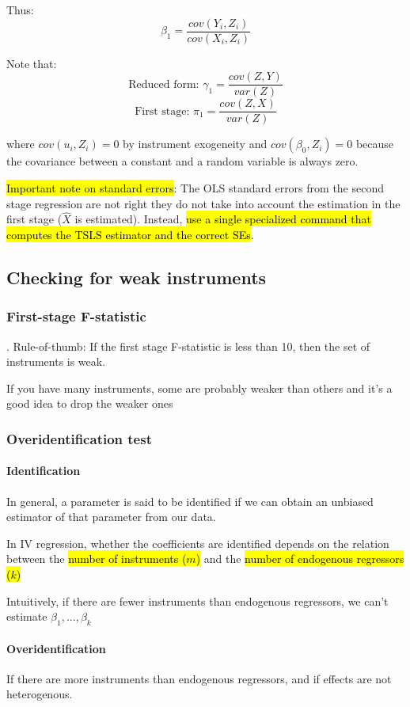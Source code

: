 \documentclass[a3paper, 8pt]{extarticle}
\begin{document}
\begin{multicols*}{5}
Thus: $$\beta_1=\frac{cov(Y_i,Z_i)}{cov(X_i,Z_i)}$$

Note that: $$\text{Reduced form:  }\gamma_1=\frac{cov(Z,Y)}{var(Z)}$$
$$\text{First stage: }\pi_1=\frac{cov(Z,X)}{var(Z)}$$

where $cov(u_i, Z_i)=0$ by instrument exogeneity and $cov(\beta_0, Z_i)=0$ because the covariance between a constant and a random variable is always zero.

\hl{Important note on standard errors}:
The OLS standard errors from the second stage regression are not right they do not take into account the estimation in the first stage ($\hat{X}$ is estimated).
Instead, \hl{use a single specialized command that computes the TSLS estimator and the correct SEs}.


\subsection{Checking for weak instruments}

\subsubsection{First-stage F-statistic}.
Rule-of-thumb: If the first stage F-statistic is less than 10, then the set of instruments is weak.

If you have many instruments, some are probably weaker than others and it's a good idea to drop the weaker ones

\subsubsection{Overidentification test}

\paragraph{Identification} In general, a parameter is said to be identified if we can obtain an unbiased estimator of that parameter from our data.


In IV regression, whether the coefficients are identified depends on the relation between the \hl{number of instruments ($m$)} and the \hl{number of endogenous regressors ($k$)}

Intuitively, if there are fewer instruments than endogenous regressors, we can't estimate $\beta_1, ..., \beta_k$

\paragraph{Overidentification} 
If there are more instruments than endogenous regressors, and if effects are not heterogenous.


\end{multicols*}
\end{document}
